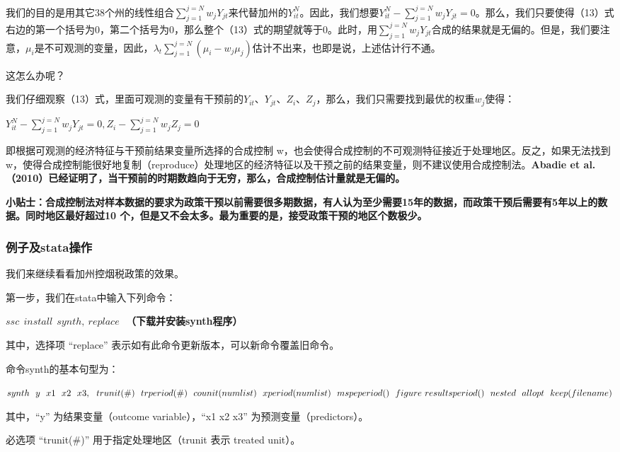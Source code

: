 \documentclass[cn,12pt,math=newtx,citestyle=gb7714-2015,bibstyle=gb7714-2015]{elegantbook}
\begin{document}
	我们的目的是用其它38个州的线性组合$\sum_{j=1}^{j=N}w_jY_{jt}$来代替加州的$Y_{it}^N$。因此，我们想要$Y_{it}^N-\sum_{j=1}^{j=N}w_jY_{jt}=0$。那么，我们只要使得（13）式右边的第一个括号为0，第二个括号为0，那么整个（13）式的期望就等于0。此时，用$\sum_{j=1}^{j=N}w_jY_{jt}$合成的结果就是无偏的。但是，我们要注意，$\mu_i$是不可观测的变量，因此，$\lambda_t\sum_{j=1}^{j=N}(\mu_i-w_j\mu_j)$估计不出来，也即是说，上述估计行不通。
	
	这怎么办呢？
	
	我们仔细观察（13）式，里面可观测的变量有干预前的$Y_{it}$、$Y_{jt}$、$Z_i$、$Z_j$，那么，我们只需要找到最优的权重$w_j$使得：
	\begin{center}
		$Y_{it}^N-\sum_{j=1}^{j=N}w_jY_{jt}=0,Z_i-\sum_{j=1}^{j=N}w_jZ_j=0$
	\end{center}
	
	即根据可观测的经济特征与干预前结果变量所选择的合成控制 w，也会使得合成控制的不可观测特征接近于处理地区。反之，如果无法找到 w，使得合成控制能很好地复制（reproduce）处理地区的经济特征以及干预之前的结果变量，则不建议使用合成控制法。\textbf{Abadie et al.（2010）已经证明了，当干预前的时期数趋向于无穷，那么，合成控制估计量就是无偏的。}
	
	\textbf{小贴士：合成控制法对样本数据的要求为政策干预以前需要很多期数据，有人认为至少需要15年的数据，而政策干预后需要有5年以上的数据。同时地区最好超过10 个，但是又不会太多。最为重要的是，接受政策干预的地区个数极少。}
	
	\subsubsection{例子及stata操作}
	
	我们来继续看看加州控烟税政策的效果。
	
	第一步，我们在stata中输入下列命令：
	
	\textbf{$ssc~~install~~synth,~replace~~~$（下载并安装synth程序）}
	
	其中，选择项 “replace” 表示如有此命令更新版本，可以新命令覆盖旧命令。
	
	命令synth的基本句型为：
	
	\textbf{$synth~~y~~x1~~x2~~x3 ,~~trunit(\#)~~trperiod(\#)~~counit(numlist)~~xperiod(numlist)~~mspeperiod()~~figure~~\\
		resultsperiod()~~nested~~allopt~~keep(filename)$}
	
	其中，“y” 为结果变量（outcome variable），“x1 x2 x3” 为预测变量（predictors）。
	
	必选项 “trunit(\#)” 用于指定处理地区（trunit 表示 treated unit）。
	
\end{document}
